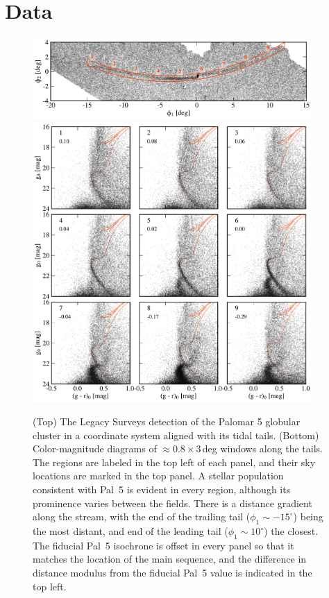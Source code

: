 \documentclass[modern]{aastex62}
\begin{document}
\section{Data}
\label{sec:data}

\begin{figure}
\begin{center}
\includegraphics[width=0.95\textwidth]{fig1_a_map.pdf}
\includegraphics[width=0.95\textwidth]{fig1_b_cmds.pdf}
\end{center}
\caption{
(Top) The Legacy Surveys detection of the Palomar 5 globular cluster in a coordinate system aligned with its tidal tails.
(Bottom) Color-magnitude diagrams of $\approx0.8\times3$\,deg windows along the tails.
The regions are labeled in the top left of each panel, and their sky locations are marked in the top panel.
A stellar population consistent with Pal~5 is evident in every region, although its prominence varies between the fields.
There is a distance gradient along the stream, with the end of the trailing tail ($\phi_1\sim-15^\circ$) being the most distant, and end of the leading tail ($\phi_1\sim10^\circ$) the closest.
The fiducial Pal~5 isochrone is offset in every panel so that it matches the location of the main sequence, and the difference in distance modulus from the fiducial Pal~5 value is indicated in the top left.
}
\label{fig:cmds}
\end{figure}
\end{document}
